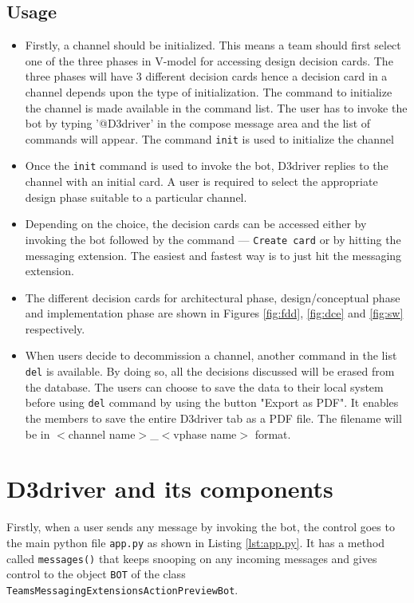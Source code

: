 \subsection{Usage}
\begin{itemize}
\item Firstly, a channel should be initialized. This means a team should first select one of the three phases in V-model for accessing design decision cards. The three phases will have 3 different decision cards hence a decision card in a channel depends upon the type of initialization. The command to initialize the channel is made available in the command list. The user has to invoke the bot by typing '@D3driver' in the compose message area and the list of commands will appear. The command \texttt{init} is used to initialize the channel 

\item Once the \texttt{init} command is used to invoke the bot, D3driver replies to the channel with an initial card. A user is required to select the appropriate design phase suitable to a particular channel. 

\item Depending on the choice, the decision cards can be accessed either by invoking the bot followed by the command --- \texttt{Create card} or by hitting the messaging extension. The easiest and fastest way is to just hit the messaging extension. 

\item The different decision cards for architectural phase, design/conceptual phase and implementation phase are shown in Figures \ref{fig:fdd}, \ref{fig:dce} and \ref{fig:sw} respectively.

\item When users decide to decommission a channel, another command in the list \texttt{del} is available. By doing so, all the decisions discussed will be erased from the database. The users can choose to save the data to their local system before using \texttt{del} command by using the button "Export as PDF". It enables the members to save the entire D3driver tab as a PDF file. The filename will be in $<$channel name$>$\_$<$vphase name$>$ format. 

\end{itemize}

\section{D3driver and its components}
Firstly, when a user sends any message by invoking the bot, the control goes to the main python file \texttt{app.py} as shown in Listing \ref{lst:app.py}. It has a method called \texttt{messages()} that keeps snooping on any incoming messages and gives control to the object \texttt{BOT} of the class \newline
\texttt{TeamsMessagingExtensionsActionPreviewBot}.

